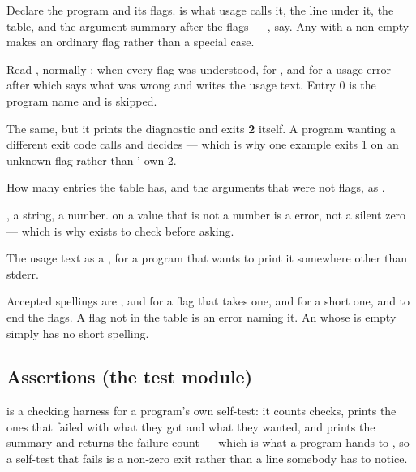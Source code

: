\begin{description}[style=nextline,leftmargin=5.2em]
\item[\ic{args.init(name, blurb, opts, tail)}] Declare the program and its flags.
   is what usage calls it,  the line under it,  the
  table, and  the argument summary after the flags --- ,
  say. Any  with a non-empty  makes  an ordinary flag
  rather than a special case.
\item[\ic{args.parse(toks)}] Read , normally :  when
  every flag was understood,  for , and 
  for a usage error --- after which  says what was wrong and
   writes the usage text. Entry 0 is the program
  name and is skipped.
\item[\ic{args.parse\_or\_exit(toks)}] The same, but it prints the
  diagnostic and exits \textbf{2} itself. A program wanting a different exit code calls
   and decides --- which is why one example exits 1 on an
  unknown flag rather than ' own 2.
\item[\ic{args.nopts()}] How many entries the table has, and
   the arguments that were not flags, as \ic{[str]}.
\item[\ic{args.has(long)}] ,  a
  string,  a number.  on a value
  that is not a number is a  error, not a silent zero --- which is why
   exists to check before asking.
\item[\ic{args.usage()}] The usage text as a , for a program that wants to
  print it somewhere other than stderr.
\end{description}

Accepted spellings are ,  and  for a
flag that takes one,  and  for a short one, and \ic{--} to end
the flags. A flag not in the table is an error naming it. An  whose
 is empty simply has no short spelling.

\subsection{Assertions (the test module)}
\label{sec:builtin-test}

 is a checking harness for a program's own self-test: it counts
checks, prints the ones that failed with what they got and what they wanted, and
 prints the summary and returns the failure count --- which is
what a program hands to , so a self-test that fails is a non-zero exit
rather than a line somebody has to notice.

